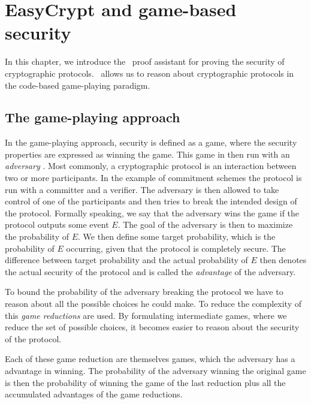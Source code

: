 \chapter{EasyCrypt and game-based security}
\label{ch:EasyCrypt}
In this chapter, we introduce the \easycrypt\ proof assistant for proving the security
of cryptographic protocols. \easycrypt\ allows us to reason about cryptographic
protocols in the code-based game-playing paradigm.

\section{The game-playing approach}
\label{sec:game-based-sec}
In the game-playing approach, security is defined as a game, where
the security properties are expressed as winning the game. This game in then run with an
\textit{adversary} \cite{game-playing}. Most commonly, a cryptographic protocol
is an interaction between two or more participants. In the example of commitment schemes
the protocol is run with a committer and a verifier. The adversary is then
allowed to take control of one of the participants and then tries to break the
intended design of the protocol.
Formally speaking, we say that the adversary
wins the game if the protocol outputs some event $E$. The goal of the adversary
is then to maximize the probability of $E$.
We then define some target probability, which is the probability of $E$
occurring, given that the protocol is completely secure. The difference between
target probability and the actual probability of $E$ then denotes the actual
security of the protocol and is called the \textit{advantage} of the adversary.

To bound the probability of the adversary breaking the protocol we have to
reason about all the possible choices he could make. To reduce the complexity of
this \textit{game reductions} are used. By formulating intermediate games, where
we reduce the set of possible choices, it becomes easier to reason
about the security of the protocol.

Each of these game reduction are themselves games, which the adversary has a advantage in winning.
The probability of the adversary winning the original game is then the probability of winning
the game of the last reduction plus all the accumulated advantages of the
game reductions.


